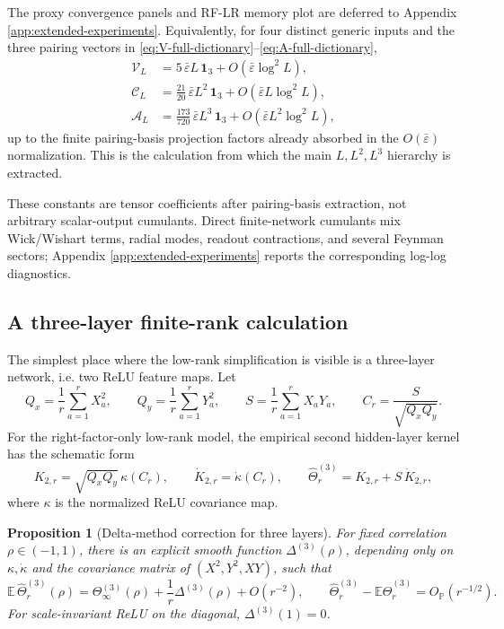 \documentclass{article}
\newtheorem{proposition}[theorem]{Proposition}
\newcommand{\E}{\mathbb E}
\newcommand{\Pp}{\mathbb P}
\newcommand{\wh}{\widehat}
\newcommand{\barE}{\bar\varepsilon}
\begin{document}
The proxy convergence panels and RF-LR memory plot are deferred to Appendix \ref{app:extended-experiments}.
Equivalently, for four distinct generic inputs and the three pairing vectors in \eqref{eq:V-full-dictionary}--\eqref{eq:A-full-dictionary},
\begin{align}
\mathcal V_L
&=
5\,\barE L\,\mathbf 1_3+O(\barE\log^2L),\\
\mathcal C_L
&=
\frac{21}{20}\,\barE L^2\,\mathbf 1_3+O(\barE L\log^2L),\\
\mathcal A_L
&=
\frac{173}{720}\,\barE L^3\,\mathbf 1_3+O(\barE L^2\log^2L),
\label{eq:pairing-vector-asymptotics}
\end{align}
up to the finite pairing-basis projection factors already absorbed in the \(O(\barE)\) normalization. This is the calculation from which the main \(L,L^2,L^3\) hierarchy is extracted.



These constants are tensor coefficients after pairing-basis extraction, not arbitrary scalar-output cumulants. Direct finite-network cumulants mix Wick/Wishart terms, radial modes, readout contractions, and several Feynman sectors; Appendix \ref{app:extended-experiments} reports the corresponding log-log diagnostics.

\iffalse
\subsection{A three-layer finite-rank calculation}
The simplest place where the low-rank simplification is visible is a three-layer network, i.e. two ReLU feature maps. Let
\[
Q_x=\frac1r\sum_{a=1}^{r}X_a^2,\qquad
Q_y=\frac1r\sum_{a=1}^{r}Y_a^2,\qquad
S=\frac1r\sum_{a=1}^{r}X_aY_a,
\qquad
C_r=\frac{S}{\sqrt{Q_xQ_y}}.
\]
For the right-factor-only low-rank model, the empirical second hidden-layer kernel has the schematic form
\[
K_{2,r}=\sqrt{Q_xQ_y}\,\kappa(C_r),
\qquad
\dot K_{2,r}=\dot\kappa(C_r),
\qquad
\wh\Theta^{(3)}_r=K_{2,r}+S\,\dot K_{2,r},
\]
where \(\kappa\) is the normalized ReLU covariance map.

\begin{proposition}[Delta-method correction for three layers]
\label{prop:three-layer-delta}
For fixed correlation \(\rho\in(-1,1)\), there is an explicit smooth function \(\Delta^{(3)}(\rho)\), depending only on \(\kappa,\dot\kappa\) and the covariance matrix of \((X^2,Y^2,XY)\), such that
\begin{equation}
\E\,\wh\Theta^{(3)}_r(\rho)
=\Theta^{(3)}_\infty(\rho)+\frac1r\Delta^{(3)}(\rho)+O(r^{-2}),
\qquad
\wh\Theta^{(3)}_r-\E\wh\Theta^{(3)}_r=O_{\Pp}(r^{-1/2}).
\label{eq:three-layer-delta}
\end{equation}
For scale-invariant ReLU on the diagonal, \(\Delta^{(3)}(1)=0\).
\end{proposition}
\end{document}
